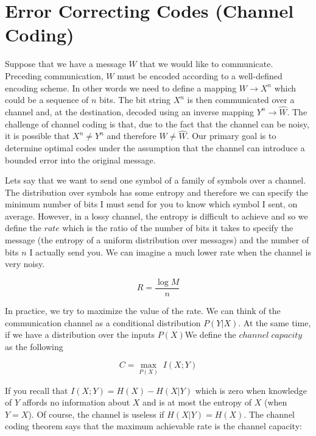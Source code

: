 \documentclass[a4paper,11pt]{book}
\begin{document}
\section{Error Correcting Codes (Channel Coding)}

Suppose that we have a message $W$ that we would like to communicate. Preceding communication, $W$ must be encoded according to a well-defined encoding scheme. In other words we need to define a mapping $W \rightarrow X^{n}$ which could be a sequence of $n$ bits. The bit string $X^{n}$ is then communicated over a channel and, at the destination, decoded using an inverse mapping $Y^{n} \rightarrow \hat{W}$. The challenge of channel coding is that, due to the fact that the channel can be noisy, it is possible that $X^{n} \neq Y^{n}$ and therefore $W \neq \hat{W}$. Our primary goal is to determine optimal codes under the assumption that the channel can introduce a bounded error into the original message. 


Lets say that we want to send one symbol of a family of symbols over a channel. The distribution over symbols has some entropy and therefore we can specify the minimum number of bits I must send for you to know which symbol I sent, on average. However, in a lossy channel, the entropy is difficult to achieve and so we define the $rate$ which is the ratio of the number of bits it takes to specify the message (the entropy of a uniform distribution over messages) and the number of bits $n$ I actually send you. We can imagine a much lower rate when the channel is very noisy.

\begin{equation*}
R = \frac{\log M}{n}
\end{equation*}

In practice, we try to maximize the value of the rate. We can think of the communication channel as a conditional distribution $P(Y|X)$. At the same time, if we have a distribution over the inputs $P(X)$We define the $channel\; capacity$ as the following 

\begin{equation*}
C = \underset{P(X)}\max \;I(X;Y) 
\end{equation*}

If you recall that $I(X;Y) = H(X) - H(X|Y)$ which is zero when knowledge of $Y$ affords no information about $X$ and is at most the entropy of $X$ (when $Y=X$). Of course, the channel is useless if $H(X|Y) = H(X)$. The channel coding theorem says that the maximum achievable rate is the channel capacity:
\end{document}

